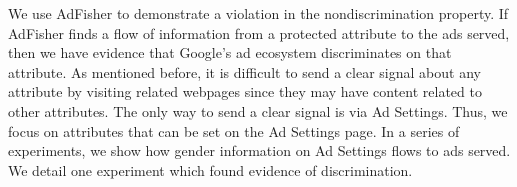 \documentclass[10pt, onecolumn]{report}
\begin{document}
We use AdFisher to demonstrate a violation in the nondiscrimination property. %
If AdFisher finds a flow of information from a protected attribute to 
the ads served, then we have evidence that Google's ad ecosystem discriminates
on that attribute. 
As mentioned before, it is difficult to send a clear signal about any attribute by 
visiting related webpages since they may have content related to other attributes. 
The only way to send a clear signal is via Ad Settings. 
Thus, we focus on attributes that can be set on the Ad Settings page.  
In a series of experiments, we show how gender information on Ad Settings flows to
ads served. 
We detail one experiment which found evidence of discrimination.
\end{document}
